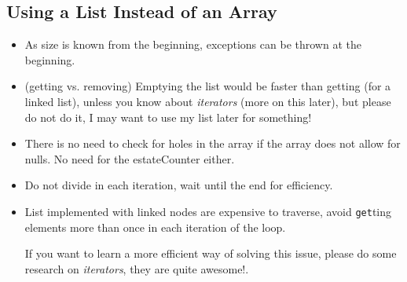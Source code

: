 \documentclass[a4paper, 9pt]{extarticle}
\begin{document}
\subsection{Using a List Instead of an Array}

\begin{multicols}{2}
\begin{itemize}

  \item As size is known from the beginning, exceptions can be thrown at the
    beginning.


  \item (getting vs. removing) Emptying the list would be faster than getting
    (for a linked list), unless you know about \emph{iterators} (more on this
    later), but please do not do it, I may want to use my list later for
    something!

  \item There is no need to check for holes in the array if the array does not
    allow for nulls. No need for the estateCounter either.

  \item Do not divide in each iteration, wait until the end for efficiency.

  \item List implemented with linked nodes are expensive to traverse, avoid
    \texttt{get}ting elements more than once in each iteration of the loop.

    If you want to learn a more efficient way of solving this issue, please do
    some research on \emph{iterators}, they are quite awesome!.

\end{itemize}
\columnbreak
{}
\end{multicols}
\end{document}
